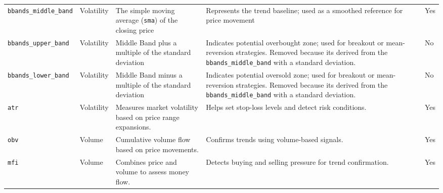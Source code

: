 \begin{landscape}
\begin{longtable}{llp{8cm}p{8cm}p{1.5cm}}
        \texttt{bbands\_middle\_band} 
        & Volatility 
        & The simple moving average (\texttt{sma}) of the closing price 
        & Represents the trend baseline; used as a smoothed reference 
          for price movement 
        & Yes 
        \\ \rowcolor{lightgray}
        \texttt{bbands\_upper\_band} 
        & Volatility 
        & Middle Band plus a multiple of the standard deviation 
        & Indicates potential overbought zone; used for breakout or
          mean-reversion strategies. Removed because its derived from 
          the \texttt{bbands\_middle\_band} with a standard deviation.
        & No 
        \\ \rowcolor{lightgray}
        \texttt{bbands\_lower\_band}  
        & Volatility 
        & Middle Band minus a multiple of the standard deviation 
        & Indicates potential oversold zone; used for breakout or 
          mean-reversion strategies. Removed because its derived from 
          the \texttt{bbands\_middle\_band} with a standard deviation.
        & No 
        \\
        \texttt{atr} 
        & Volatility 
        & Measures market volatility based on price range expansions. 
        & Helps set stop-loss levels and detect risk conditions. 
        & Yes
        \\
        \texttt{obv}
        & Volume 
        & Cumulative volume flow based on price movements. 
        & Confirms trends using volume-based signals. 
        & Yes
        \\
        \texttt{mfi}
        & Volume
        & Combines price and volume to assess money flow. 
        & Detects buying and selling pressure for trend confirmation. 
        & Yes\\
        \hline
\end{longtable}
\end{landscape}
